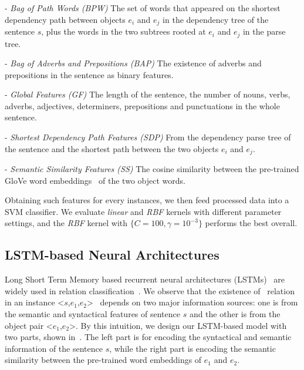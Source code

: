 - \textit{Bag of Path Words (BPW)}
The set of words that appeared on
the shortest dependency path between objects $e_i$ and $e_j$ in the 
dependency tree of the sentence $s$, plus the words in the two subtrees 
rooted at $e_i$ and $e_j$ in the parse tree.
 
- \textit{Bag of Adverbs and Prepositions (BAP)}
The existence of adverbs and prepositions in the sentence as binary 
features. 

- \textit{Global Features (GF)}
The length of the sentence, the number of nouns, verbs, adverbs, adjectives, determiners, prepositions and punctuations in the whole sentence. 

- \textit{Shortest Dependency Path Features (SDP)}
From the dependency parse tree of the sentence and the shortest path 
between the two objects $e_i$ and $e_j$. 

- \textit{Semantic Similarity Features (SS)}
The cosine similarity between the pre-trained GloVe word embeddings~\cite{pennington2014glove} of the two object words.

Obtaining such features for every instances, 
we then feed processed data into a SVM classifier. 
We evaluate \textit{linear} and \textit{RBF} kernels with different parameter settings, and the \textit{RBF} kernel with $\{C=100, \gamma=10^{-3}\}$ performs the best overall.

\subsection{LSTM-based Neural Architectures}
Long Short Term Memory based recurrent neural architectures (LSTMs)~\cite{hochreiter1997long} are widely used in relation classification~\cite{socher2011semi,ebrahimi2015chain,xu2015classifying,xu2016improved}.
We observe that the existence of \lnear~relation in 
an instance \textless $s$,$e_1$,$e_2$\textgreater~ depends 
on two major information sources: one is from the semantic and syntactical features of sentence $s$ 
and the other is from the object pair \textless$e_1$,$e_2$\textgreater.
By this intuition, we design our LSTM-based model with two parts, shown in~.
The left part is for encoding the syntactical and semantic information of the sentence $s$, while the right part is encoding the semantic similarity between the pre-trained word embeddings of $e_1$ and $e_2$.

